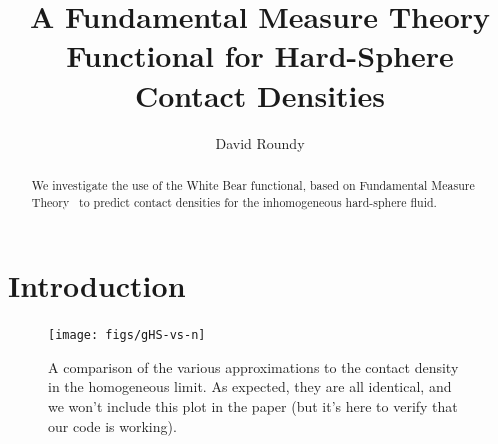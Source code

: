 \documentclass[letterpaper,twocolumn,amsmath,amssymb,prb]{revtex4-1}
\begin{document}
\title{A Fundamental Measure Theory Functional for Hard-Sphere Contact Densities}

\author{David Roundy}

\begin{abstract}
  We investigate the use of the White Bear functional,
  based on Fundamental Measure Theory~\cite{roth2002whitebear} to
  predict contact densities for the inhomogeneous hard-sphere fluid.
\end{abstract}

\maketitle

\section{Introduction}


\begin{figure}
\texttt{[image: figs/gHS-vs-n]}
\caption{A comparison of the various approximations to the contact
  density in the homogeneous limit.  As expected, they are all
  identical, and we won't include this plot in the paper (but it's
  here to verify that our code is working).}
\label{fig:gHS-vs-n}
\end{figure}

\end{document}
